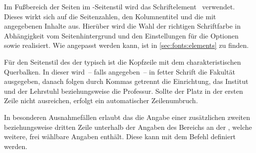 \begin{Declaration*}{}
\begin{Declaration*}{}
\begin{Declaration*}{}
\begin{Declaration}[v2.04]{}
\printdeclarationlist%
%
%
Im Fußbereich der Seiten im -Seitenstil wird das  
Schriftelement~ verwendet. Dieses wirkt sich auf die 
Seitenzahlen, den Kolumnentitel und die mit  angegebenen 
Inhalte aus. Hierüber wird die Wahl der richtigen Schriftfarbe in Abhängigkeit 
vom Seitenhintergrund und den Einstellungen für die Optionen  
sowie  realisiert. Wie  angepasst werden kann, 
ist in \autoref{sec:fonts:elements} zu finden.
\end{Declaration}
%

\begin{Declaration}{}
\begin{Declaration}{}
\begin{Declaration}{}
\begin{Declaration}{}
\begin{Declaration}{}
\printdeclarationlist%
%
%
%
%
Für den Seitenstil des \CDs der \TnUD typisch ist die Kopfzeile mit dem 
charakteristischen Querbalken. In dieser wird~-- falls angegeben~-- in fetter 
Schrift die Fakultät ausgegeben, danach folgen durch Kommas getrennt die 
Einrichtung, das Institut und der Lehrstuhl beziehungsweise die Professur. 
Sollte der Platz in der ersten Zeile nicht ausreichen, erfolgt ein 
automatischer Zeilenumbruch.

In besonderen Ausnahmefällen erlaubt das \CD die Angabe einer zusätzlichen
zweiten beziehungsweise dritten Zeile unterhalb der Angaben des Bereichs an der 
\TnUD, welche weitere, frei wählbare Angaben enthält. Diese kann mit dem Befehl 
 definiert werden.
\end{Declaration}
\end{Declaration}
\end{Declaration}
\end{Declaration}
\end{Declaration}


\end{Declaration*}
\end{Declaration*}
\end{Declaration*}

